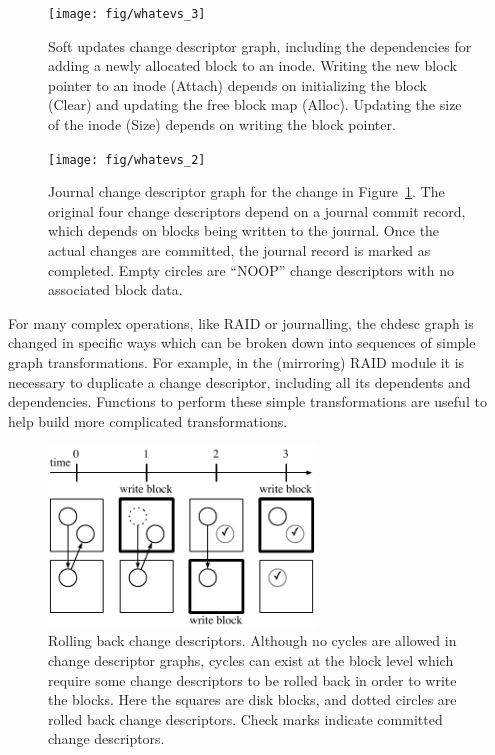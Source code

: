 \begin{figure}[b]
  \centering
  \texttt{[image: fig/whatevs\_3]}%
  \caption{\label{fig:softupdates} Soft updates change descriptor graph,
  including the dependencies for adding a newly allocated block to an
  inode. Writing the new block pointer to an inode (Attach) depends on
  initializing the block (Clear) and updating the free block map (Alloc).
  Updating the size of the inode (Size) depends on writing the block
  pointer.}
\end{figure}

\begin{figure}
  \centering
  \texttt{[image: fig/whatevs\_2]}%
  \caption{\label{fig:journal} Journal change descriptor graph for the
  change in Figure~\ref{fig:softupdates}.  The original four change
  descriptors depend on a journal commit record, which depends on blocks
  being written to the journal.  Once the actual changes are committed, the
  journal record is marked as completed.  Empty circles are ``NOOP'' change
  descriptors with no associated block data.  }
\end{figure}

For many complex operations, like RAID or journalling, the chdesc graph is
changed in specific ways which can be broken down into sequences of simple graph
transformations. For example, in the (mirroring) RAID module it is necessary to
duplicate a change descriptor, including all its dependents and dependencies.
Functions to perform these simple transformations are useful to help build more
complicated transformations.


\begin{figure}
  \centering
  \includegraphics[width=200pt]{rollback_sequence}
  \caption{\label{fig:rollback} Rolling back change descriptors. Although no
  cycles are allowed in change descriptor graphs, cycles can exist at the block
  level which require some change descriptors to be rolled back in order to
  write the blocks. Here the squares are disk blocks, and dotted circles are
  rolled back change descriptors. Check marks indicate committed change
  descriptors.
}
\end{figure}
